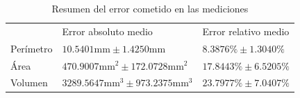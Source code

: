 \begin{table}[ht]
	\centering
	\begin{tabular}{lll}
		\hhline{===}
		& Error absoluto medio & Error relativo medio\\
		\hhline{===}
		Perímetro & $10.5401\text{mm} \pm 1.4250\text{mm}$ & $8.3876\% \pm 1.3040\%$ \\ \hline
		Área & $470.9007\text{mm}^2 \pm 172.0728\text{mm}^2$ & $17.8443\% \pm 6.5205\%$\\ \hline
		Volumen & $3289.5647\text{mm}^3 \pm 973.2375\text{mm}^3$ & $23.7977\% \pm 7.0407\%$\\
		\hline
	\end{tabular}
	\caption{Resumen del error cometido en las mediciones}
	\label{tab:err}
\end{table}
